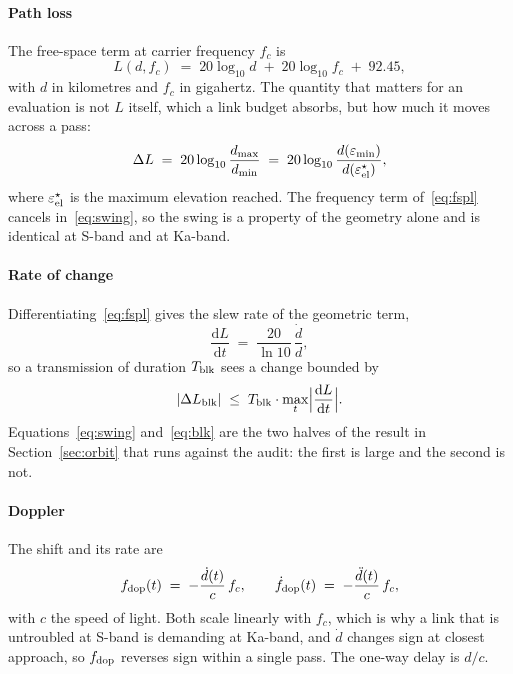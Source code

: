 \documentclass[preprint,11pt,3p]{elsarticle}
\begin{document}
\paragraph{Path loss}
The free-space term at carrier frequency $f_c$ is
\begin{equation}
  L(d, f_c) \;=\; 20 \log_{10} d \;+\; 20 \log_{10} f_c \;+\; 92.45 ,
  \label{eq:fspl}
\end{equation}
with $d$ in kilometres and $f_c$ in gigahertz. The quantity that matters for an evaluation is
not $L$ itself, which a link budget absorbs, but how much it moves across a pass:
\begin{equation}
  \Delta L \;=\; 20 \log_{10} \frac{d_{\max}}{d_{\min}}
  \;=\; 20 \log_{10} \frac{d(\varepsilon_{\min})}{d(\varepsilon_{\rm el}^{\star})} ,
  \label{eq:swing}
\end{equation}
where $\varepsilon_{\rm el}^{\star}$ is the maximum elevation reached. The frequency term
of~\eqref{eq:fspl} cancels in~\eqref{eq:swing}, so the swing is a property of the geometry alone
and is identical at S-band and at Ka-band.

\paragraph{Rate of change}
Differentiating~\eqref{eq:fspl} gives the slew rate of the geometric term,
\begin{equation}
  \frac{\mathrm{d}L}{\mathrm{d}t} \;=\; \frac{20}{\ln 10}\, \frac{\dot d}{d} ,
  \label{eq:slew}
\end{equation}
so a transmission of duration $T_{\rm blk}$ sees a change bounded by
\begin{equation}
  |\Delta L_{\rm blk}| \;\le\; T_{\rm blk} \cdot
  \max_{t} \Bigl| \frac{\mathrm{d}L}{\mathrm{d}t} \Bigr| .
  \label{eq:blk}
\end{equation}
Equations~\eqref{eq:swing} and~\eqref{eq:blk} are the two halves of the result in
Section~\ref{sec:orbit} that runs against the audit: the first is large and the second is not.

\paragraph{Doppler}
The shift and its rate are
\begin{equation}
  f_{\rm dop}(t) \;=\; -\frac{\dot d(t)}{c}\, f_c ,
  \qquad
  \dot f_{\rm dop}(t) \;=\; -\frac{\ddot d(t)}{c}\, f_c ,
  \label{eq:doppler}
\end{equation}
with $c$ the speed of light. Both scale linearly with $f_c$, which is why a link that is
untroubled at S-band is demanding at Ka-band, and $\dot d$ changes sign at closest approach, so
$f_{\rm dop}$ reverses sign within a single pass. The one-way delay is $d/c$.
\end{document}
